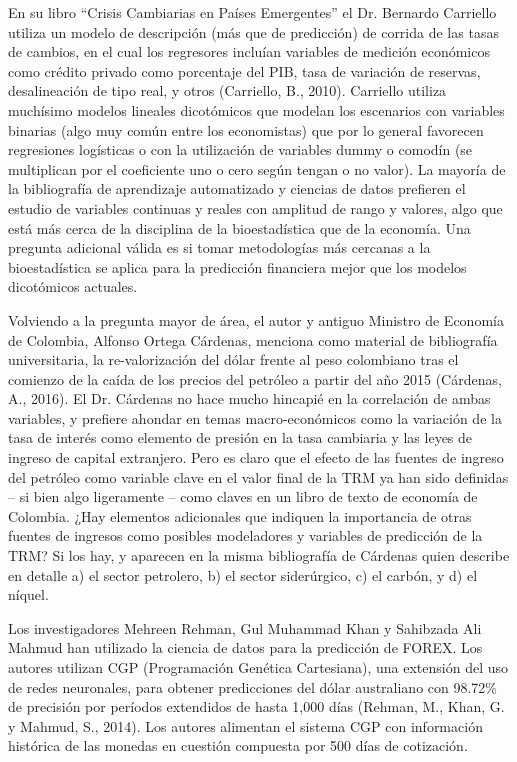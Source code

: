En su libro “Crisis Cambiarias en Países Emergentes” el Dr. Bernardo Carriello utiliza un modelo de descripción (más que de predicción) de corrida de las tasas de cambios, en el cual los regresores incluían variables de medición económicos como crédito privado como porcentaje del PIB, tasa de variación de reservas, desalineación de tipo real, y otros (Carriello, B., 2010). Carriello utiliza muchísimo modelos lineales dicotómicos que modelan los escenarios con variables binarias (algo muy común entre los economistas) que por lo general favorecen regresiones logísticas o con la utilización de variables dummy o comodín (se multiplican por el coeficiente uno o cero según tengan o no valor). La mayoría de la bibliografía de aprendizaje automatizado y ciencias de datos prefieren el estudio de variables continuas y reales con amplitud de rango y valores, algo que está más cerca de la disciplina de la bioestadística que de la economía. Una pregunta adicional válida es si tomar metodologías más cercanas a la bioestadística se aplica para la predicción financiera mejor que los modelos dicotómicos actuales.

Volviendo a la pregunta mayor de área, el autor y antiguo Ministro de Economía de Colombia, Alfonso Ortega Cárdenas, menciona como material de bibliografía universitaria, la re-valorización del dólar frente al peso colombiano tras el comienzo de la caída de los precios del petróleo a partir del año 2015 (Cárdenas, A., 2016). El Dr. Cárdenas no hace mucho hincapié en la correlación de ambas variables, y prefiere ahondar en temas macro-económicos como la variación de la tasa de interés como elemento de presión en la tasa cambiaria y las leyes de ingreso de capital extranjero. Pero es claro que el efecto de las fuentes de ingreso del petróleo como variable clave en el valor final de la TRM ya han sido definidas – si bien algo ligeramente – como claves en un libro de texto de economía de Colombia. ¿Hay elementos adicionales que indiquen la importancia de otras fuentes de ingresos como posibles modeladores y variables de predicción de la TRM? Si los hay, y aparecen en la misma bibliografía de Cárdenas quien describe en detalle a) el sector petrolero, b) el sector siderúrgico, c) el carbón, y d) el níquel.

Los investigadores Mehreen Rehman, Gul Muhammad Khan y Sahibzada Ali Mahmud han utilizado la ciencia de datos para la predicción de FOREX. Los autores utilizan CGP (Programación Genética Cartesiana), una extensión del uso de redes neuronales, para obtener predicciones del dólar australiano con 98.72\% de precisión por períodos extendidos de hasta 1,000 días (Rehman, M., Khan, G. y Mahmud, S., 2014). Los autores alimentan el sistema CGP con información histórica de las monedas en cuestión compuesta por 500 días de cotización.


